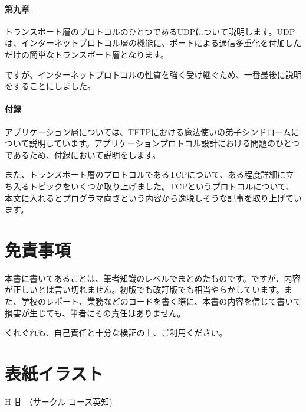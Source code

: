 \paragraph{第九章}
トランスポート層のプロトコルのひとつであるUDPについて説明します。UDPは、インターネットプロトコル層の機能に、ポートによる通信多重化を付加しただけの簡単なトランスポート層となります。

ですが、インターネットプロトコルの性質を強く受け継ぐため、一番最後に説明をすることにしました。


\paragraph{付録}
アプリケーション層については、TFTPにおける魔法使いの弟子シンドロームについて説明しています。アプリケーションプロトコル設計における問題のひとつであるため、付録において説明をします。

また、トランスポート層のプロトコルであるTCPについて、ある程度詳細に立ち入るトピックをいくつか取り上げました。TCPというプロトコルについて、本文に入れるとプログラマ向きという内容から逸脱しそうな記事を取り上げています。

\section*{免責事項}
本書に書いてあることは、筆者知識のレベルでまとめたものです。ですが、内容が正しいとは言い切れません。初版でも改訂版でも相当やらかしています。また、学校のレポート、業務などのコードを書く際に、本書の内容を信じて書いて損害が生じても、筆者にその責任はありません。

くれぐれも、自己責任と十分な検証の上、ご利用ください。

\section*{表紙イラスト}
H-甘 （サークル コース英知)